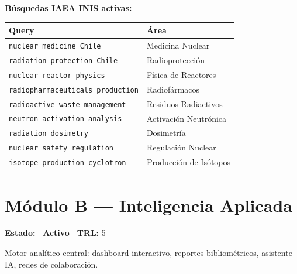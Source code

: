 \documentclass[12pt,a4paper]{report}
\newcommand{\badge}[2]{%
  \colorbox{#1}{\color{white}\small\textbf{\ #2\ }}%
}
\newcommand{\bactive}{\badge{cchengreen}{Activo}}
\begin{document}
\textbf{Búsquedas IAEA INIS activas:}

\begin{center}
\begin{tabular}{L{7cm}L{6cm}}
  \toprule
  \textbf{Query} & \textbf{Área} \\
  \midrule
  \texttt{nuclear medicine Chile} & Medicina Nuclear \\
  \texttt{radiation protection Chile} & Radioprotección \\
  \texttt{nuclear reactor physics} & Física de Reactores \\
  \texttt{radiopharmaceuticals production} & Radiofármacos \\
  \texttt{radioactive waste management} & Residuos Radiactivos \\
  \texttt{neutron activation analysis} & Activación Neutrónica \\
  \texttt{radiation dosimetry} & Dosimetría \\
  \texttt{nuclear safety regulation} & Regulación Nuclear \\
  \texttt{isotope production cyclotron} & Producción de Isótopos \\
  \bottomrule
\end{tabular}
\end{center}

\section{Módulo B --- Inteligencia Aplicada}
\textbf{Estado:} \bactive \quad \textbf{TRL:} 5

Motor analítico central: dashboard interactivo, reportes bibliométricos, asistente IA, redes de colaboración.
\end{document}
